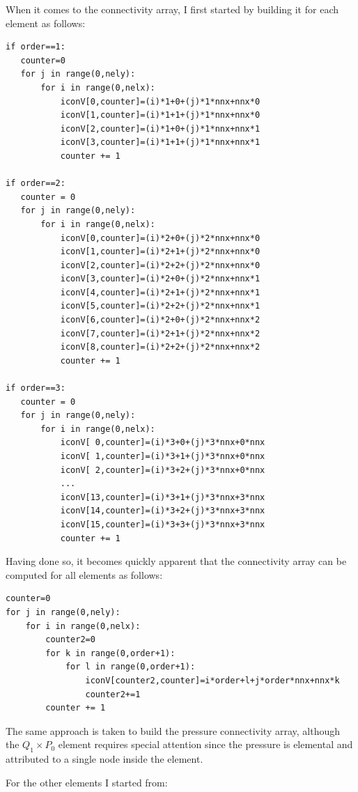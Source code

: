 When it comes to the connectivity array, I first started by building it 
for each element as follows:

\begin{lstlisting}
if order==1:
   counter=0
   for j in range(0,nely):
       for i in range(0,nelx):
           iconV[0,counter]=(i)*1+0+(j)*1*nnx+nnx*0 
           iconV[1,counter]=(i)*1+1+(j)*1*nnx+nnx*0 
           iconV[2,counter]=(i)*1+0+(j)*1*nnx+nnx*1 
           iconV[3,counter]=(i)*1+1+(j)*1*nnx+nnx*1 
           counter += 1

if order==2:
   counter = 0
   for j in range(0,nely):
       for i in range(0,nelx):
           iconV[0,counter]=(i)*2+0+(j)*2*nnx+nnx*0 
           iconV[1,counter]=(i)*2+1+(j)*2*nnx+nnx*0 
           iconV[2,counter]=(i)*2+2+(j)*2*nnx+nnx*0 
           iconV[3,counter]=(i)*2+0+(j)*2*nnx+nnx*1 
           iconV[4,counter]=(i)*2+1+(j)*2*nnx+nnx*1 
           iconV[5,counter]=(i)*2+2+(j)*2*nnx+nnx*1 
           iconV[6,counter]=(i)*2+0+(j)*2*nnx+nnx*2 
           iconV[7,counter]=(i)*2+1+(j)*2*nnx+nnx*2
           iconV[8,counter]=(i)*2+2+(j)*2*nnx+nnx*2 
           counter += 1

if order==3:
   counter = 0
   for j in range(0,nely):
       for i in range(0,nelx):
           iconV[ 0,counter]=(i)*3+0+(j)*3*nnx+0*nnx 
           iconV[ 1,counter]=(i)*3+1+(j)*3*nnx+0*nnx 
           iconV[ 2,counter]=(i)*3+2+(j)*3*nnx+0*nnx 
           ...
           iconV[13,counter]=(i)*3+1+(j)*3*nnx+3*nnx 
           iconV[14,counter]=(i)*3+2+(j)*3*nnx+3*nnx 
           iconV[15,counter]=(i)*3+3+(j)*3*nnx+3*nnx 
           counter += 1
\end{lstlisting}
Having done so, it becomes quickly apparent that the connectivity array 
can be computed for all elements as follows:
\begin{lstlisting}
counter=0
for j in range(0,nely):
    for i in range(0,nelx):
        counter2=0
        for k in range(0,order+1):
            for l in range(0,order+1):
                iconV[counter2,counter]=i*order+l+j*order*nnx+nnx*k
                counter2+=1
        counter += 1
\end{lstlisting}
The same approach is taken to build the pressure connectivity array, 
although the $Q_1\times P_0$ element requires special attention since
the pressure is elemental and attributed to a single node inside the element. 

For the other elements I started from:

